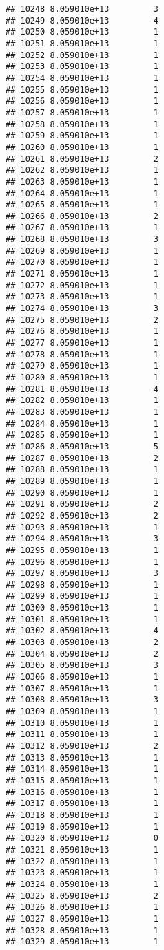 \documentclass[
]{article}
\begin{document}
\begin{verbatim}
## 10248 8.059010e+13         3
## 10249 8.059010e+13         4
## 10250 8.059010e+13         1
## 10251 8.059010e+13         1
## 10252 8.059010e+13         1
## 10253 8.059010e+13         1
## 10254 8.059010e+13         1
## 10255 8.059010e+13         1
## 10256 8.059010e+13         1
## 10257 8.059010e+13         1
## 10258 8.059010e+13         1
## 10259 8.059010e+13         1
## 10260 8.059010e+13         1
## 10261 8.059010e+13         2
## 10262 8.059010e+13         1
## 10263 8.059010e+13         1
## 10264 8.059010e+13         1
## 10265 8.059010e+13         1
## 10266 8.059010e+13         2
## 10267 8.059010e+13         1
## 10268 8.059010e+13         3
## 10269 8.059010e+13         1
## 10270 8.059010e+13         1
## 10271 8.059010e+13         1
## 10272 8.059010e+13         1
## 10273 8.059010e+13         1
## 10274 8.059010e+13         3
## 10275 8.059010e+13         2
## 10276 8.059010e+13         1
## 10277 8.059010e+13         1
## 10278 8.059010e+13         1
## 10279 8.059010e+13         1
## 10280 8.059010e+13         1
## 10281 8.059010e+13         4
## 10282 8.059010e+13         1
## 10283 8.059010e+13         1
## 10284 8.059010e+13         1
## 10285 8.059010e+13         1
## 10286 8.059010e+13         5
## 10287 8.059010e+13         2
## 10288 8.059010e+13         1
## 10289 8.059010e+13         1
## 10290 8.059010e+13         1
## 10291 8.059010e+13         2
## 10292 8.059010e+13         2
## 10293 8.059010e+13         1
## 10294 8.059010e+13         3
## 10295 8.059010e+13         1
## 10296 8.059010e+13         1
## 10297 8.059010e+13         3
## 10298 8.059010e+13         1
## 10299 8.059010e+13         1
## 10300 8.059010e+13         1
## 10301 8.059010e+13         1
## 10302 8.059010e+13         4
## 10303 8.059010e+13         2
## 10304 8.059010e+13         2
## 10305 8.059010e+13         3
## 10306 8.059010e+13         1
## 10307 8.059010e+13         1
## 10308 8.059010e+13         3
## 10309 8.059010e+13         1
## 10310 8.059010e+13         1
## 10311 8.059010e+13         1
## 10312 8.059010e+13         2
## 10313 8.059010e+13         1
## 10314 8.059010e+13         1
## 10315 8.059010e+13         1
## 10316 8.059010e+13         1
## 10317 8.059010e+13         1
## 10318 8.059010e+13         1
## 10319 8.059010e+13         1
## 10320 8.059010e+13         0
## 10321 8.059010e+13         1
## 10322 8.059010e+13         1
## 10323 8.059010e+13         1
## 10324 8.059010e+13         1
## 10325 8.059010e+13         2
## 10326 8.059010e+13         1
## 10327 8.059010e+13         1
## 10328 8.059010e+13         1
## 10329 8.059010e+13         1

\end{verbatim}
\end{document}
